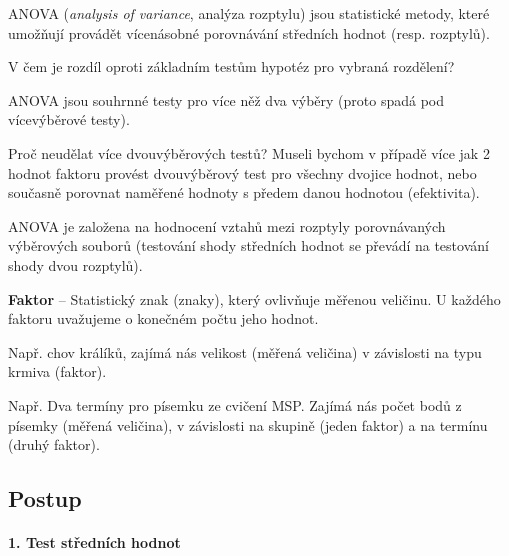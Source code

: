\begin{compactitem}
    \item ANOVA (\textit{analysis of variance}, analýza rozptylu) jsou statistické metody, které umožňují provádět vícenásobné porovnávání středních hodnot (resp. rozptylů).

    \item V čem je rozdíl oproti základním testům hypotéz pro vybraná rozdělení?

    \begin{compactitem}
        \item ANOVA jsou souhrnné testy pro více něž dva výběry (proto spadá pod vícevýběrové testy).

        \item Proč neudělat více dvouvýběrových testů? Museli bychom v případě více jak 2 hodnot faktoru provést dvouvýběrový test pro všechny dvojice hodnot, nebo současně porovnat naměřené hodnoty s předem danou hodnotou (efektivita).
    \end{compactitem}

    \item ANOVA je založena na hodnocení vztahů mezi rozptyly porovnávaných výběrových souborů (testování shody středních hodnot se převádí na testování shody dvou rozptylů).

    \item \textbf{Faktor} -- Statistický znak (znaky), který ovlivňuje měřenou veličinu. U každého faktoru uvažujeme o konečném počtu jeho hodnot.  \begin{compactitem}
        \item Např. chov králíků, zajímá nás velikost (měřená veličina) v závislosti na typu krmiva (faktor).

        \item Např. Dva termíny pro písemku ze cvičení MSP. Zajímá nás počet bodů z písemky (měřená veličina), v závislosti na skupině (jeden faktor) a na termínu (druhý faktor).
    \end{compactitem}
\end{compactitem}

\subsection{Postup}

\paragraph*{1. Test středních hodnot}

